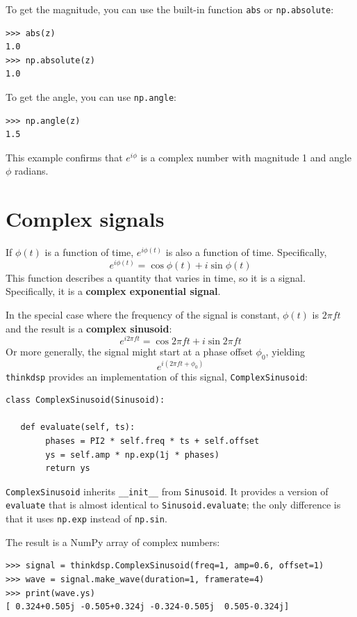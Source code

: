 \documentclass[12pt]{book}
\begin{document}
To get the magnitude, you can use the built-in function {\tt abs}
or {\tt np.absolute}:

\begin{verbatim}
>>> abs(z)
1.0
>>> np.absolute(z)
1.0
\end{verbatim}

To get the angle, you can use {\tt np.angle}:

\begin{verbatim}
>>> np.angle(z)
1.5
\end{verbatim}

This example confirms that $e^{i \phi}$ is a complex number with
magnitude 1 and angle $\phi$ radians.


\section{Complex signals}

If $\phi(t)$ is a function of time, $e^{i \phi(t)}$ is also a function
of time.  Specifically,
%
\[ e^{i \phi(t)} = \cos \phi(t) + i \sin \phi(t) \]
%
This function describes a quantity that varies in time, so it is
a signal.  Specifically, it is a {\bf complex exponential signal}.

In the special case where the frequency of the signal is constant,
$\phi(t)$ is $2 \pi f t$ and the result is a {\bf complex sinusoid}:
%
\[ e^{i 2 \pi f t} = \cos 2 \pi f t + i \sin 2 \pi f t \]
%
Or more generally, the signal might start at a phase offset
$\phi_0$, yielding
%
\[ e^{i (2 \pi f t + \phi_0)} \]
%
{\tt thinkdsp} provides an implementation of this signal,
{\tt ComplexSinusoid}:

\begin{verbatim}
class ComplexSinusoid(Sinusoid):
 
   def evaluate(self, ts):
        phases = PI2 * self.freq * ts + self.offset
        ys = self.amp * np.exp(1j * phases)
        return ys
\end{verbatim}

{\tt ComplexSinusoid} inherits \verb"__init__" from
{\tt Sinusoid}.  It provides a version of {\tt evaluate}
that is almost identical to {\tt Sinusoid.evaluate}; the
only difference is that it uses {\tt np.exp} instead of
{\tt np.sin}.

The result is a NumPy array of complex numbers:

\begin{verbatim}
>>> signal = thinkdsp.ComplexSinusoid(freq=1, amp=0.6, offset=1)
>>> wave = signal.make_wave(duration=1, framerate=4)
>>> print(wave.ys)
[ 0.324+0.505j -0.505+0.324j -0.324-0.505j  0.505-0.324j]
\end{verbatim}
\end{document}
